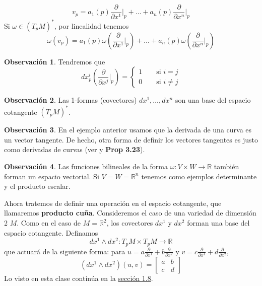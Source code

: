 \documentclass[spanish]{book}
\theoremstyle{definition}
\newtheorem*{obs}{Observación}
\newcommand{\R}{\mathbb{R}}
\begin{document}
	\[v_p=a_1(p)\frac{\partial}{\partial x^1}\Big|_p+\ldots+a_n(p)\frac{\partial}{\partial x^n}\Big|_p\]
	Si $\omega\in(T_pM)^*$, por linealidad tenemos
	\[\omega(v_p)=a_1(p)\omega\left(\frac{\partial}{\partial x^1}\Big|_p\right)+\ldots+a_n(p)\omega\left(\frac{\partial}{\partial x^n}\Big|_p\right)\]
	\begin{obs}
		Tendremos que
		\[dx_p^i\left(\frac{\partial}{\partial x^j}\Big|_p\right)=\begin{cases}
			1\qquad\text{si }i=j\\
			0\qquad\text{si }i\neq j
		\end{cases}\]
	\end{obs}
	\begin{obs}
		Las 1-formas (covectores) $dx^1,\ldots,dx^n$ son una base del espacio cotangente $(T_pM)^*$.
	\end{obs}
	\begin{obs}
		En el ejemplo anterior usamos que la derivada de una curva es un vector tangente. De hecho, otra forma de definir los vectores tangentes es justo como derivadas de curvas (ver \cite{DoCarmo} y \cite{Lee} \textbf{Prop 3.23}).
	\end{obs}
	
	\begin{obs}
		Las funciones bilineales de la forma $\omega:V\times W\to\R$ también forman un espacio vectorial. Si $V=W=\R^n$ tenemos como ejemplos determinante y el producto escalar.
	\end{obs}
	
	Ahora tratemos de definir una operación en el espacio cotangente, que llamaremos \textbf{producto cuña}. Consideremos el caso de una variedad de dimensión 2 $M$. Como en el caso de $M=\R^2$, los covectores $dx^1$ y $dx^2$ forman una base del espacio cotangente. Definamos
	\[dx^1\wedge dx^2:T_pM\times T_pM\to\R\]
	que actuará de la siguiente forma: para $u=a\frac{\partial}{\partial x^1}+b\frac{\partial}{\partial x^2}$ y $v=c\frac{\partial}{\partial x^1}+d\frac{\partial}{\partial x^2}$,
	\[(dx^1\wedge dx^2)(u,v)=\begin{bmatrix}
		a&b\\
		c&d
	\end{bmatrix}\]
	Lo visto en esta clase continúa en la \hyperref[sec:formas-dif]{sección 1.8}.
	
\end{document}
